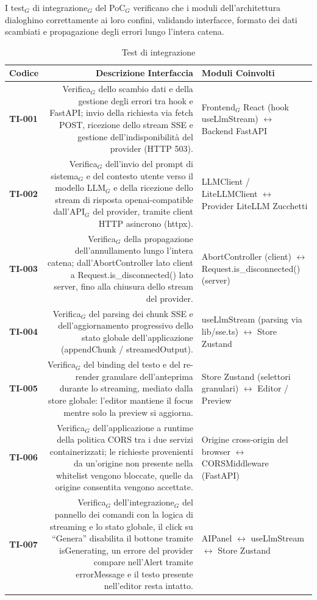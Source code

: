 \documentclass[a4paper, 10pt, colorlinks=true, linkcolor=black, urlcolor=blue, citecolor=blue, hidelinks]{article}
\begin{document}
I test$_G$ di integrazione$_G$ del PoC$_G$ verificano che i moduli dell'architettura dialoghino correttamente ai loro confini, validando interfacce, formato dei dati scambiati e propagazione degli errori lungo l'intera catena.
\begin{table}[H]
	\centering
	\begin{tabularx}{\textwidth}{|l|D|M|}
		\hline
		\textbf{Codice} & \textbf{Descrizione Interfaccia} & \textbf{Moduli Coinvolti} \\
		\hline
		\textbf{TI-001} & Verifica$_G$ dello scambio dati e della gestione degli errori tra hook e FastAPI; invio della richiesta via fetch POST, ricezione dello stream SSE e gestione dell'indisponibilità del provider (HTTP 503). & Frontend$_G$ React (hook useLlmStream) $\leftrightarrow$ Backend FastAPI \\
		\hline
		\textbf{TI-002} & Verifica$_G$ dell'invio del prompt di sistema$_G$ e del contesto utente verso il modello LLM$_G$ e della ricezione dello stream di risposta openai-compatible dall'API$_G$ del provider, tramite client HTTP asincrono (httpx). & LLMClient / LiteLLMClient $\leftrightarrow$ Provider LiteLLM Zucchetti \\
		\hline
		\textbf{TI-003} & Verifica$_G$ della propagazione dell'annullamento lungo l'intera catena; dall'AbortController lato client a Request.is\_disconnected() lato server, fino alla chiusura dello stream del provider. & AbortController (client) $\leftrightarrow$ Request.is\_disconnected() (server) \\
		\hline
		\textbf{TI-004} & Verifica$_G$ del parsing dei chunk SSE e dell'aggiornamento progressivo dello stato globale dell'applicazione (appendChunk / streamedOutput). & useLlmStream (parsing via lib/sse.ts) $\leftrightarrow$ Store Zustand \\
		\hline
		\textbf{TI-005} & Verifica$_G$ del binding del testo e del re-render granulare dell'anteprima durante lo streaming, mediato dalla store globale: l'editor mantiene il focus mentre solo la preview si aggiorna. & Store Zustand (selettori granulari) $\leftrightarrow$ Editor / Preview \\
		\hline
		\textbf{TI-006} & Verifica$_G$ dell'applicazione a runtime della politica CORS tra i due servizi containerizzati; le richieste provenienti da un'origine non presente nella whitelist vengono bloccate, quelle da origine consentita vengono accettate. & Origine cross-origin del browser $\leftrightarrow$ CORSMiddleware (FastAPI) \\
		\hline
		\textbf{TI-007} & Verifica$_G$ dell'integrazione$_G$ del pannello dei comandi con la logica di streaming e lo stato globale, il click su ``Genera'' disabilita il bottone tramite isGenerating, un errore del provider compare nell'Alert tramite errorMessage e il testo presente nell'editor resta intatto. & AIPanel $\leftrightarrow$ useLlmStream $\leftrightarrow$ Store Zustand \\
		\hline
	\end{tabularx}
	\caption{Test di integrazione}
	\label{tab:test-integrazione}
\end{table}
\end{document}

